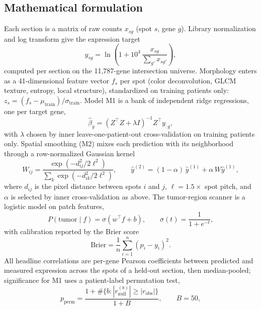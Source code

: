 \documentclass[11pt]{article}
\begin{document}
\subsection{Mathematical formulation}
Each section is a matrix of raw counts $x_{sg}$ (spot $s$, gene $g$). Library
normalization and log transform give the expression target
\begin{equation}
y_{sg} = \ln\!\left(1 + 10^{4}\,\frac{x_{sg}}{\sum_{g'} x_{sg'}}\right),
\label{eq:norm}
\end{equation}
computed per section on the 11{,}787-gene intersection universe. Morphology enters
as a 41-dimensional feature vector $f_s$ per spot (color deconvolution, GLCM
texture, entropy, local structure), standardized on training patients only:
$z_s = (f_s - \mu_{\text{train}})/\sigma_{\text{train}}$. Model M1 is a bank of
independent ridge regressions, one per target gene,
\begin{equation}
\hat\beta_g = (Z^{\top} Z + \lambda I)^{-1} Z^{\top} y_{:g},
\label{eq:ridge}
\end{equation}
with $\lambda$ chosen by inner leave-one-patient-out cross-validation on training
patients only. Spatial smoothing (M2) mixes each prediction with its neighborhood
through a row-normalized Gaussian kernel
\begin{equation}
W_{ij} = \frac{\exp(-d_{ij}^{2}/2\ell^{2})}{\sum_k \exp(-d_{ik}^{2}/2\ell^{2})},
\qquad
\hat y^{(2)} = (1-\alpha)\,\hat y^{(1)} + \alpha\, W \hat y^{(1)},
\label{eq:smooth}
\end{equation}
where $d_{ij}$ is the pixel distance between spots $i$ and $j$, $\ell = 1.5\times$
spot pitch, and $\alpha$ is selected by inner cross-validation as above. The
tumor-region scanner is a logistic model on patch features,
\begin{equation}
P(\text{tumor}\mid f) = \sigma(w^{\top} f + b), \qquad \sigma(t) = \frac{1}{1+e^{-t}},
\label{eq:scanner}
\end{equation}
with calibration reported by the Brier score
\begin{equation}
\mathrm{Brier} = \frac{1}{n}\sum_{i=1}^{n} (p_i - y_i)^2 .
\label{eq:brier}
\end{equation}
All headline correlations are per-gene Pearson coefficients between predicted and
measured expression across the spots of a held-out section, then median-pooled;
significance for M1 uses a patient-label permutation test,
\begin{equation}
p_{\text{perm}} = \frac{1 + \#\{b : |r_{\text{null}}^{(b)}| \ge |r_{\text{obs}}|\}}{1 + B},
\qquad B = 50,
\label{eq:perm}
\end{equation}
\end{document}
